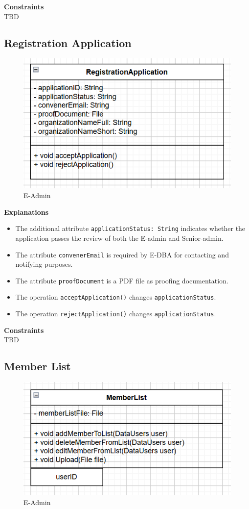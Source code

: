 \textbf{Constraints} \\
TBD

\subsection{Registration Application}
\begin{figure}[H]
    \centering
    \includegraphics[width=0.7\linewidth]{picture/3-2/3-2-6.png}
    \caption{E-Admin}
    \label{fig:enter-label}
\end{figure}

\textbf{Explanations}
\begin{itemize}
    \item The additional attribute \texttt{applicationStatus: String} indicates whether the application passes the review of both the E-admin and Senior-admin.
    \item The attribute \texttt{convenerEmail} is required by E-DBA for contacting and notifying purposes.
    \item The attribute \texttt{proofDocument} is a PDF file as proofing documentation.
    \item The operation \texttt{acceptApplication()} changes \texttt{applicationStatus}.
    \item The operation \texttt{rejectApplication()} changes \texttt{applicationStatus}.
\end{itemize}

\textbf{Constraints} \\
TBD

\subsection{Member List}
\begin{figure}[H]
    \centering
    \includegraphics[width=0.7\linewidth]{picture/3-2/3-2-7.png}
    \caption{E-Admin}
    \label{fig:enter-label}
\end{figure}

